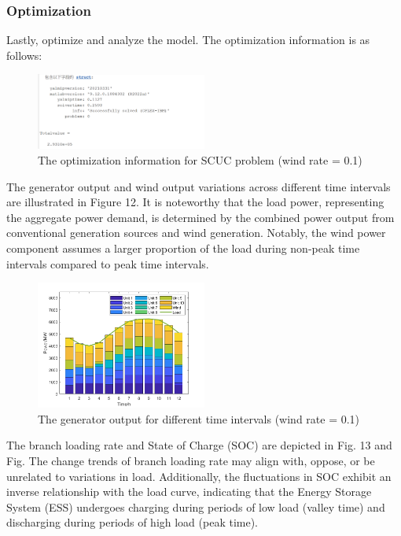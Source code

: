 \documentclass[lettersize,journal]{IEEEtran}
\begin{document}
\subsubsection{Optimization}
Lastly,  optimize and analyze the model. The optimization information is as follows:
\begin{figure}[htbp]
	\centering
	\includegraphics[width=0.5\textwidth]{t3-opt}
	\caption{The optimization information for SCUC problem (wind rate = 0.1)}
	\label{fig_2}
\end{figure}

The generator output and wind output variations across different time intervals are illustrated in Figure 12. It is noteworthy that the load power, representing the aggregate power demand, is determined by the combined power output from conventional generation sources and wind generation. Notably, the wind power component assumes a larger proportion of the load during non-peak time intervals compared to peak time intervals.

\begin{figure}[htbp]
	\centering
	\includegraphics[width=0.5\textwidth]{t3-wr0.1}
	\caption{The generator output for different time intervals (wind rate = 0.1)}
	\label{fig_2}
\end{figure}


The branch loading rate and State of Charge (SOC) are depicted in Fig. 13 and Fig. The change trends of branch loading rate may align with, oppose, or be unrelated to variations in load. Additionally, the fluctuations in SOC exhibit an inverse relationship with the load curve, indicating that the Energy Storage System (ESS) undergoes charging during periods of low load (valley time) and discharging during periods of high load (peak time).
\end{document}
